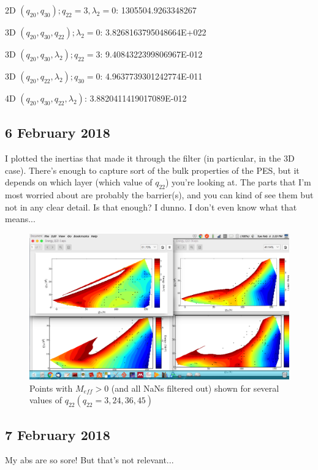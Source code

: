 \begin{list}{}{Half-lives in 2, 3, and 4 dimensions:}
\item 2D $(q_{20},q_{30}); q_{22}=3, \lambda_2=0$:    1305504.9263348267     
\item 3D $(q_{20},q_{30},q_{22}); \lambda_2=0$:    3.8268163795048664E+022
\item 3D $(q_{20},q_{30},\lambda_2); q_{22}=3$:    9.4084322399806967E-012
\item 3D $(q_{20},q_{22},\lambda_2); q_{30}=0$:    4.9637739301242774E-011
\item 4D $(q_{20},q_{30},q_{22},\lambda_2)$:       3.8820411419017089E-012
\end{list}

\subsection*{6 February 2018}
I plotted the inertias that made it through the filter (in particular, in the 3D case). There's enough to capture sort of the bulk properties of the PES, but it depends on which layer (which value of $q_{22}$) you're looking at. The parts that I'm most worried about are probably the barrier(s), and you can kind of see them but not in any clear detail. Is that enough? I dunno. I don't even know what that means...
\begin{figure}
\centering
\includegraphics[width=0.9\linewidth]{post_filtering_nans}
\caption[Points with $M_{eff}>0$]{Points with $M_{eff}>0$ (and all NaNs filtered out) shown for several values of $q_{22} (q_{22}=3,24,36,45)$}
\label{fig:post_filtering_nans}
\end{figure}

\subsection*{7 February 2018}
My abs are so sore! But that's not relevant...

